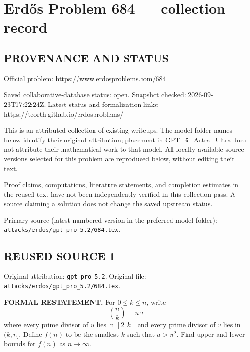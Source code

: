\section*{Erd\H{o}s Problem 684 --- collection record}

\subsection*{PROVENANCE AND STATUS}
Official problem: https://www.erdosproblems.com/684

Saved collaborative-database status: open.
Snapshot checked: 2026-09-23T17:22:24Z.
Latest status and formalization links: https://teorth.github.io/erdosproblems/

This is an attributed collection of existing writeups. The model-folder names below identify their original attribution; placement in GPT\_6\_Astra\_Ultra does not attribute their mathematical work to that model. All locally available source versions selected for this problem are reproduced below, without editing their text.

Proof claims, computations, literature statements, and completion estimates in the reused text have not been independently verified in this collection pass. A source claiming a solution does not change the saved upstream status.

Primary source (latest numbered version in the preferred model folder): \texttt{attacks/erdos/gpt\_pro\_5.2/684.tex}.

\subsection*{REUSED SOURCE 1}
Original attribution: \texttt{gpt\_pro\_5.2}.
Original file: \texttt{attacks/erdos/gpt\_pro\_5.2/684.tex}.

\item
\textbf{FORMAL RESTATEMENT.}
For $0\le k\le n$, write
\[\binom{n}{k}=u\,v\]
where every prime divisor of $u$ lies in $[2,k]$ and every prime divisor of $v$ lies in $(k,n]$.
Define $f(n)$ to be the smallest $k$ such that $u>n^{2}$.
Find upper and lower bounds for $f(n)$ as $n\to\infty$.

